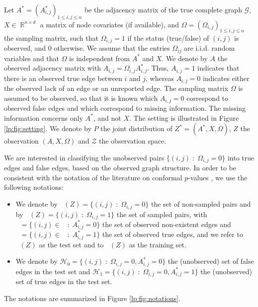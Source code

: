 \documentclass[a4paper, 11pt]{article}
\theoremstyle{remark}
\DeclareMathOperator{\R}{\mathbb{R}}
\DeclareMathOperator{\Dtr}{\cD_{\text{train}}}
\DeclareMathOperator{\Dtest}{\cD_{\text{test}}}
\DeclareMathOperator{\DtrNull}{\cD^0_{\text{train}}}
\DeclareMathOperator{\DtrAlt}{\cD^1_{\text{train}}}
\newcommand{\EM}{\ensuremath}
\newcommand{\cD}{\EM{\mathcal{D}}}
\newcommand{\cG}{\EM{\mathcal{G}}}
\newcommand{\cH}{\EM{\mathcal{H}}}
\newcommand{\cZ}{\EM{\mathcal{Z}}}
\begin{document}
Let $A^* = (A^*_{i,j})_{1 \leq i,j \leq n}$ be the adjacency matrix of the true complete graph $\cG$, $X \in \R^{n \times d}$ a matrix of node covariates (if available), and $\Omega = (\Omega_{i,j})_{1 \leq i,j \leq n}$ the sampling matrix, such that $\Omega_{i,j} = 1$ if the status (true/false) of $(i,j)$ is observed, and $0$ otherwise. We assume that the entries $\Omega_{ij}$ are i.i.d. random variables and that $\Omega$ is independent from $A^*$ and $X$. 
We denote by $A$ the observed adjacency matrix with $A_{i,j} = \Omega_{i,j} A^*_{i,j}$. Thus, $A_{i,j}=1$ indicates that there is an observed true edge between $i$ and $j$, whereas $A_{i,j}=0$ indicates either the observed lack of an edge or an unreported edge. The sampling matrix $\Omega$ is assumed to be observed, so that it is known which $A_{i,j}=0$ correspond to observed false edges and which correspond to missing information. 
The missing information concerns only $A^*$, and not $X$. 
The setting is illustrated in Figure \ref{lp:fig:setting}. 
We denote by $P$ the joint distribution of $Z^* = (A^*, X, \Omega)$, 
$Z$ the observation $(A, X, \Omega)$ and $\cZ$ the observation space. 

We are interested in classifying the unobserved pairs $\{ (i,j) \; \colon \;  \Omega_{i,j} = 0\}$ into true edges and false edges, based on the observed graph structure. In order to be consistent with the notation of the literature on conformal $p$-values \citep{bates2023testing, liang2022integrative, marandon22b}, we use the following notations:
\begin{itemize}
\item We denote by $\Dtest(Z)=\{ (i,j) \; \colon \;  \Omega_{i,j} = 0\}$ the set of non-sampled pairs and by $\Dtr(Z)=\{ (i,j) \; \colon \;  \Omega_{i,j} = 1\}$ the set of sampled pairs, with $\DtrNull = \{ (i,j) \in \Dtr \; \colon \; A^*_{i,j} = 0 \}$ the set of observed non-existent edges and $\DtrAlt = \{ (i,j) \in \Dtr \; \colon \; A^*_{i,j} = 1 \}$ the set of observed true edges, and we refer to $\Dtest(Z)$ as the test set and to $\Dtr(Z)$ as the training set. 
\item We denote by $\cH_0 = \{(i,j) \; \colon \; \Omega_{i,j} = 0, A^*_{i,j} = 0 \} $ the (unobserved) set of false edges in the test set and $\cH_1 = \{(i,j) \; \colon \; \Omega_{i,j} = 0, A^*_{i,j} = 1 \}$ the (unobserved) set of true edges in the test set. 
\end{itemize}
The notations are summarized in Figure \ref{lp:fig:notations}. 
\end{document}
